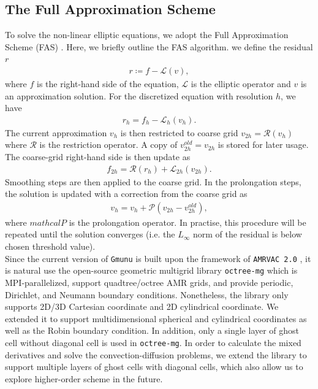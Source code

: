 \subsection{The Full Approximation Scheme} %
\label{section3.1.5}
To solve the non-linear elliptic equations,
we adopt the Full Approximation Scheme (FAS) \cite{brandt1977multi,brabazon2014nonlinear,press1996numerical}.
Here, we briefly outline the FAS algorithm.
we define the residual $r$
\begin{align}
    r \coloneqq f - \mathcal{L} \left(v \right),
\end{align}
where $f$ is the right-hand side of the equation, 
$\mathcal{L}$ is the elliptic operator
and $v$ is an approximation solution.
For the discretized equation with resolution $h$, we have
\begin{align}
    r_h = f_h - \mathcal{L}_h \left( v_h \right).
\end{align}
The current approximation $v_h$ is then restricted to coarse grid
$v_{2h} = \mathcal{R} \left( v_h \right)$ where $\mathcal{R}$ is the restriction operator.
A copy of $v^{old}_{2h} = v_{2h}$ is stored for later usage. 
The coarse-grid right-hand side is then update as
\begin{align}
    f_{2h} = \mathcal{R} \left(r_h \right) + \mathcal{L}_{2h} \left(v_{2h} \right).
\end{align}
Smoothing steps are then applied to the coarse grid.
In the prolongation steps,
the solution is updated with a correction from the coarse grid as
\begin{align}
    v_{h} = v_{h} + \mathcal{P} \left(v_{2h} - v^{old}_{2h} \right),
\end{align}
where $mathcal{P}$ is the prolongation operator.
In practise, this procedure will be repeated until the solution converges
(i.e. the $L_\infty$ norm of the residual is below chosen threshold value).\\
Since the current version of \texttt{Gmunu} is built upon the framework of \texttt{AMRVAC 2.0} \cite{xia2018mpi,keppens2021mpi},
it is natural use the open-source geometric multigrid library \texttt{octree-mg} \cite{teunissen2019geometric} 
which is MPI-parallelized, support quadtree/octree AMR grids,
and provide periodic, Dirichlet, and Neumann boundary conditions.
Nonetheless, the library only supports 2D/3D Cartesian coordinate and 2D cylindrical coordinate.
We extended it to support multidimensional spherical and cylindrical coordinates as well as the Robin boundary condition.
In addition, only a single layer of ghost cell without diagonal cell is used in \texttt{octree-mg}.
In order to calculate the mixed derivatives and solve the convection-diffusion problems,
we extend the library to support multiple layers of ghost cells with diagonal cells,
which also allow us to explore higher-order scheme in the future.

